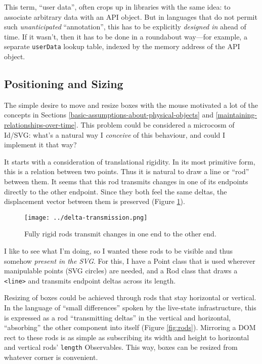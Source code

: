 This term, ``user data'', often crops up in libraries with the same
idea: to associate arbitrary data with an API object. But in languages
that do not permit such \emph{unanticipated} ``annotation'', this has to
be explicitly \emph{designed in} ahead of time. If it wasn't, then it
has to be done in a roundabout way---for example, a separate
\texttt{userData} lookup table, indexed by the memory address of the API
object.

\hypertarget{positioning-and-sizing}{%
\subsection{Positioning and Sizing}\label{positioning-and-sizing}}

The simple desire to move and resize boxes with the mouse motivated a
lot of the concepts in Sections
\ref{basic-assumptions-about-physical-objects} and
\ref{maintaining-relationships-over-time}. This problem could be
considered a microcosm of Id{}/SVG: what's a natural way I
\emph{conceive} of this behaviour, and could I implement it that way?

It starts with a consideration of translational rigidity. In its most
primitive form, this is a relation between two points. Thus it is
natural to draw a line or ``rod'' between them. It seems that this rod
transmits changes in one of its endpoints directly to the other
endpoint. Since they both feel the same deltas, the displacement vector
between them is preserved (Figure \ref{fig:delta-transmission}).

\begin{figure}[h]
  \centering
  \texttt{[image: ../delta-transmission.png]}
  \caption{Fully rigid rods transmit changes in one end to the other end. \label{fig:delta-transmission}}
\end{figure}

I like to see what I'm doing, so I wanted these rods to be visible and
thus somehow \emph{present in the SVG}. For this, I have a Point class
that is used wherever manipulable points (SVG circles) are needed, and a
Rod class that draws a \texttt{\textless{}line\textgreater{}} and
transmits endpoint deltas across its length.

Resizing of boxes could be achieved through rods that stay horizontal or
vertical. In the language of ``small differences'' spoken by the
live-state infrastructure, this is expressed as a rod ``transmitting
deltas'' in the vertical and horizontal, ``absorbing'' the other
component into itself (Figure \ref{fig:rods}). Mirroring a DOM rect to
these rods is as simple as subscribing its width and height to
horizontal and vertical rods' \texttt{length} Observables. This way,
boxes can be resized from whatever corner is convenient.

